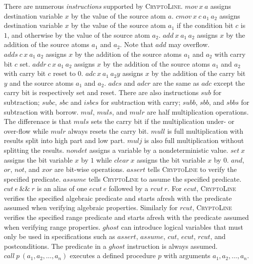 \documentclass{article}
\newcommand{\cryptoline}{\textsc{CryptoLine}\xspace}
\newcommand{\imov}{\mathit{mov}\xspace}
\newcommand{\iadd}{\mathit{add}\xspace}
\newcommand{\iadds}{\mathit{adds}\xspace}
\newcommand{\iaddr}{\mathit{addr}\xspace}
\newcommand{\iadc}{\mathit{adc}\xspace}
\newcommand{\iadcs}{\mathit{adcs}\xspace}
\newcommand{\iadcr}{\mathit{adcr}\xspace}
\newcommand{\isub}{\mathit{sub}\xspace}
\newcommand{\isubc}{\mathit{subc}\xspace}
\newcommand{\isubb}{\mathit{subb}\xspace}
\newcommand{\isbc}{\mathit{sbc}\xspace}
\newcommand{\isbb}{\mathit{sbb}\xspace}
\newcommand{\isbbs}{\mathit{sbbs}\xspace}
\newcommand{\imul}{\mathit{mul}\xspace}
\newcommand{\imuls}{\mathit{muls}\xspace}
\newcommand{\imulr}{\mathit{mulr}\xspace}
\newcommand{\imull}{\mathit{mull}\xspace}
\newcommand{\imulj}{\mathit{mulj}\xspace}
\newcommand{\iset}{\mathit{set}\xspace}
\newcommand{\iclear}{\mathit{clear}\xspace}
\newcommand{\inondet}{\mathit{nondet}\xspace}
\newcommand{\icmov}{\mathit{cmov}\xspace}
\newcommand{\iand}{\mathit{and}\xspace}
\newcommand{\ior}{\mathit{or}\xspace}
\newcommand{\ixor}{\mathit{xor}\xspace}
\newcommand{\inot}{\mathit{not}\xspace}
\newcommand{\iassert}{\mathit{assert}\xspace}
\newcommand{\iassume}{\mathit{assume}\xspace}
\newcommand{\ighost}{\mathit{ghost}\xspace}
\newcommand{\icut}{\mathit{cut}\xspace}
\newcommand{\iecut}{\mathit{ecut}\xspace}
\newcommand{\ircut}{\mathit{rcut}\xspace}
\newcommand{\icall}{\mathit{call}\xspace}
\newcommand{\band}{\&\&}
\begin{document}
There are numerous \emph{instructions} supported by \cryptoline.
$\imov\ x\ a$ assigns destination variable $x$ by the value of the
source atom $a$.
$\icmov\ x\ c\ a_1\ a_2$ assigns destination variable $x$ by the value of the
source atom $a_1$ if the condition bit $c$ is $1$, and otherwise by
the value of the source atom $a_2$.
$\iadd\ x\ a_1\ a_2$ assigns $x$ by the addition of the source atoms
$a_1$ and $a_2$.
Note that $\iadd$ may overflow.
$\iadds\ c\ x\ a_1\ a_2$ assigns $x$ by the addition of the source atoms
$a_1$ and $a_2$ with carry bit $c$ set.
$\iaddr\ c\ x\ a_1\ a_2$ assigns $x$ by the addition of the source atoms
$a_1$ and $a_2$ with carry bit $c$ reset to $0$.
$\iadc\ x\ a_1\ a_2 y$ assigns $x$ by the addition of the carry bit $y$
and the source atoms $a_1$ and $a_2$.
$\iadcs$ and $\iadcr$ are the same as $\iadc$ except the carry bit is
respectively set and reset.
There are also instructions $\isub$ for subtraction; $\isubc$, $\isbc$
and $isbcs$ for subtraction with carry; $\isubb$, $\isbb$, and
$\isbbs$ for subtraction with borrow.
$\imul$, $\imuls$, and $\imulr$ are half multiplication operations.
The differenace is that $\imuls$ sets the carry bit if the
multiplication under- or over-flow while $\imulr$ always resets the
carry bit.
$\imull$ is full multiplication with results split into high part and
low part.
$\imulj$ is also full multiplication without splitting the results.
$\inondet$ assigns a variable by a nondeterministic value.
$\iset\ x$ assigns the bit variable $x$ by $1$ while $\iclear\ x$
assigns the bit variable $x$ by $0$.
$\iand$, $\ior$, $\inot$, and $\ixor$ are bit-wise operations.
$\iassert$ tells \cryptoline to verify the specified predicate.
$\iassume$ tells \cryptoline to assume the specified predicate.
$\icut\ e\ \band\ r$ is an alias of one $\iecut\ e$ followed by a
$\ircut\ r$.
For $\iecut$, \cryptoline verifies the specified algebraic predicate
and starts afresh with the predicate assumed when verifying algebraic
properties.
Similarly for $\ircut$, \cryptoline verifies the specified range
predicate and starts afresh with the predicate assumed when verifying
range properties.
$\ighost$ can introduce logical variables that must only be used in
specifications such as $\iassert$, $\iassume$, $\icut$, $\iecut$,
$\ircut$, and postconditions.
The predicate in a $\ighost$ instruction is always assumed.
$\icall\ p\ (a_1, a_2, \ldots, a_n)$ executes a defined procedure $p$
with arguments $a_1, a_2, \ldots, a_n$.
\end{document}
